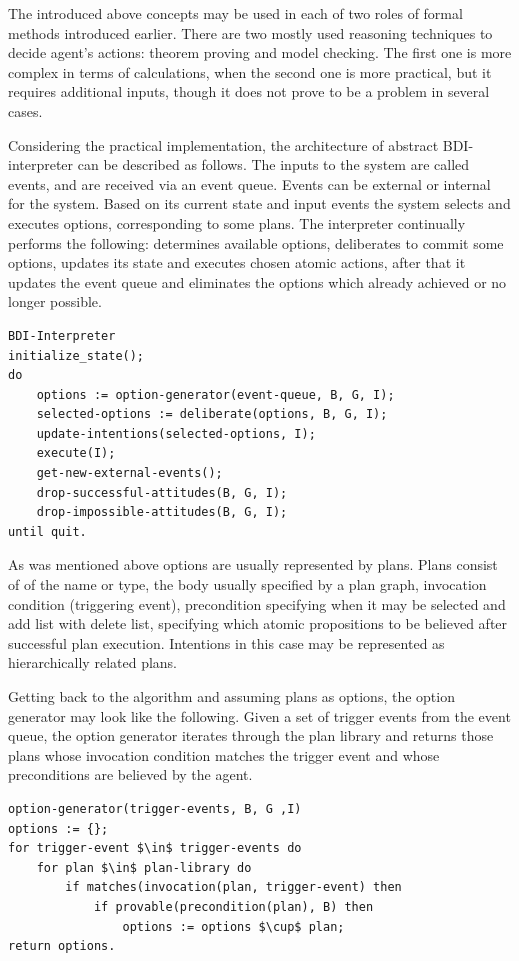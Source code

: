 The introduced above concepts may be used in each of two roles of formal methods introduced earlier. There are two mostly used reasoning techniques to decide agent's actions: theorem proving and model checking. The first one is more complex in terms of calculations, when the second one is more practical, but it requires additional inputs, though it does not prove to be a problem in several cases.

Considering the practical implementation, the architecture of abstract BDI-interpreter can be described as follows. The inputs to the system are called events, and are received via an event queue. Events can be external or internal for the system. Based on its current state and input events the system selects and executes options, corresponding to some plans. The interpreter continually performs the following: determines available options, deliberates to commit some options, updates its state and executes chosen atomic actions, after that it updates the event queue and eliminates the options which already achieved or no longer possible.
%
\begin{lstlisting}
BDI-Interpreter
initialize_state();
do
    options := option-generator(event-queue, B, G, I);
    selected-options := deliberate(options, B, G, I);
    update-intentions(selected-options, I);
    execute(I);
    get-new-external-events();
    drop-successful-attitudes(B, G, I);
    drop-impossible-attitudes(B, G, I);
until quit.
\end{lstlisting}

As was mentioned above options are usually represented by plans. Plans consist of of the name or type, the body usually specified by a plan graph, invocation condition (triggering event), precondition specifying when it may be selected and add list with delete list, specifying which atomic propositions to be believed after successful plan execution. Intentions in this case may be represented as hierarchically related plans.

Getting back to the algorithm and assuming plans as options, the option generator may look like the following.
Given a set of trigger events from the event queue, the option generator iterates through the plan library and returns those plans whose invocation condition
matches the trigger event and whose preconditions are believed by the agent.
%
\begin{lstlisting}[mathescape]
option-generator(trigger-events, B, G ,I)
options := {};
for trigger-event $\in$ trigger-events do
    for plan $\in$ plan-library do
        if matches(invocation(plan, trigger-event) then
            if provable(precondition(plan), B) then
                options := options $\cup$ plan;
return options.
\end{lstlisting}


